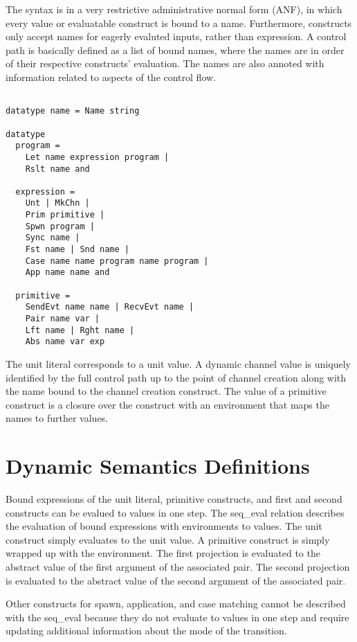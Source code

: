 \documentclass{article}
\begin{document}
The syntax is in a very restrictive administrative normal form (ANF), in which every value or
evaluatable construct is bound to a name.  Furthermore, constructs only accept names for
eagerly evaluted inputs, rather than expression.  A control path is basically defined as a list
of bound names, where the names are in order of their respective constructs' evaluation. The
names are also annoted with information related to aspects of the control flow. 

\begin{lstlisting}[language=logic, style=codestyle1, escapechar=\%]

datatype name = Name string

datatype 
  program = 
    Let name expression program |
    Rslt name and 

  expression = 
    Unt | MkChn |
    Prim primitive |
    Spwn program |
    Sync name |
    Fst name | Snd name |
    Case name name program name program |
    App name name and 

  primitive = 
    SendEvt name name | RecvEvt name |
    Pair name var |
    Lft name | Rght name |
    Abs name var exp

  \end{lstlisting}


The unit literal corresponds to a unit value. A dynamic channel value is uniquely identified by
the full control path up to the point of channel creation along with the name bound to the
channel creation construct. The value of a primitive construct is a closure over the construct
with an environment that maps the names to further values.

\section{Dynamic Semantics Definitions}

Bound expressions of the unit literal, primitive constructs, and first and second constructs
can be evalued to values in one step. The seq\_eval relation describes the evaluation of bound
expressions with environments to values. The unit construct simply evaluates to the unit
value.  A primitive construct is simply wrapped up with the environment.  The first projection is
evaluated to the abstract value of the first argument of the associated pair. The second
projection is evaluated to the abstract value of the second argument of the associated pair.

Other constructs for spawn, application, and case matching cannot be described with the
seq\_eval because they do not evaluate to values in one step and require updating additional
information about the mode of the transition. 
\end{document}
